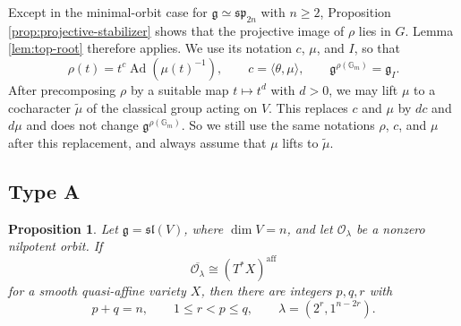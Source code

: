 \documentclass[10pt,a4paper]{amsart}
\newtheorem{proposition}[theorem]{Proposition}
\DeclareMathOperator{\Ad}{Ad}
\newcommand{\Gm}{\mathbb G_m}
\newcommand{\aff}{\mathrm{aff}}
\begin{document}
Except in the minimal-orbit case for
$\mathfrak g\simeq\mathfrak{sp}_{2n}$ with $n\geq2$, Proposition
\ref{prop:projective-stabilizer} shows that the projective image of
$\rho$ lies in $G$. Lemma \ref{lem:top-root} therefore applies.
We use its notation $c$, $\mu$, and $I$, so that
\begin{equation}\label{eq:rho-classical}
\rho(t)=t^c\Ad(\mu(t)^{-1}),
\qquad
c=\langle\theta,\mu\rangle,
\qquad
\mathfrak g^{\rho(\Gm)}=\mathfrak g_I.
\end{equation}
After precomposing $\rho$ by a suitable map $t\mapsto t^d$ with $d>0$, we may
lift $\mu$ to a cocharacter $\widetilde{\mu}$ of the classical group
acting on $V$. This replaces $c$ and $\mu$ by $dc$ and $d\mu$ and does
not change $\mathfrak g^{\rho(\Gm)}$. So we still use the same
notations $\rho$, $c$, and $\mu$ after this replacement, and always
assume that $\mu$ lifts to $\widetilde{\mu}$.

\subsection{Type A}\label{sec:typeA}

\begin{proposition}\label{prop:typeA}
Let $\mathfrak g=\mathfrak{sl}(V)$, where $\dim V=n$, and let
$\mathcal O_\lambda$ be a nonzero nilpotent orbit. If
\[
\overline{\mathcal O_\lambda}\cong(T^*X)^{\aff}
\]
for a smooth quasi-affine variety $X$, then
there are integers $p,q,r$ with
\[
p+q=n,
\qquad
1\leq r<p\leq q,
\qquad
\lambda=(2^r,1^{n-2r}).
\]
\end{proposition}
\end{document}
